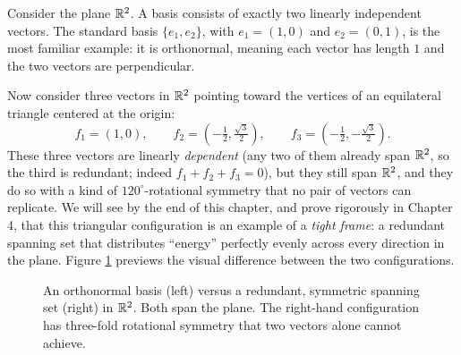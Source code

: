 Consider the plane $\mathbb{R}^2$. A basis consists of exactly two linearly independent vectors. The standard basis $\{e_1, e_2\}$, with $e_1 = (1,0)$ and $e_2 = (0,1)$, is the most familiar example: it is orthonormal, meaning each vector has length $1$ and the two vectors are perpendicular.

Now consider three vectors in $\mathbb{R}^2$ pointing toward the vertices of an equilateral triangle centered at the origin:
$$
f_1 = (1, 0), \qquad f_2 = \left(-\tfrac{1}{2}, \tfrac{\sqrt 3}{2}\right), \qquad f_3 = \left(-\tfrac{1}{2}, -\tfrac{\sqrt 3}{2}\right).
$$
These three vectors are linearly \emph{dependent} (any two of them already span $\mathbb{R}^2$, so the third is redundant; indeed $f_1+f_2+f_3=0$), but they still span $\mathbb{R}^2$, and they do so with a kind of $120^\circ$-rotational symmetry that no pair of vectors can replicate. We will see by the end of this chapter, and prove rigorously in Chapter 4, that this triangular configuration is an example of a \emph{tight frame}: a redundant spanning set that distributes ``energy'' perfectly evenly across every direction in the plane. Figure \ref{fig:basis-vs-frame} previews the visual difference between the two configurations.

\begin{figure}[h]
\centering
{}
\caption{An orthonormal basis (left) versus a redundant, symmetric spanning set (right) in $\mathbb{R}^2$. Both span the plane. The right-hand configuration has three-fold rotational symmetry that two vectors alone cannot achieve.}
\label{fig:basis-vs-frame}
\end{figure}

